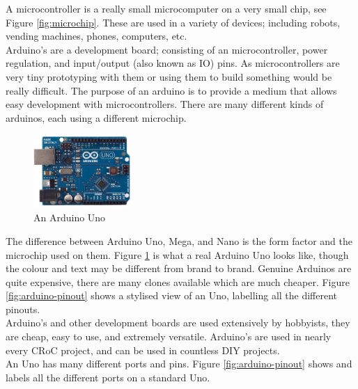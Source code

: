 \documentclass[a4paper,12pt]{article}
\begin{document}
A microcontroller is a really small microcomputer on a very small chip, see Figure \ref{fig:microchip}.
These are used in a variety of devices; including robots, vending machines, phones, computers, etc. \\

Arduino's are a development board; consisting of an microcontroller, power regulation, and input/output (also known as IO) pins. As microcontrollers are very tiny prototyping with them or using them to build something would be really difficult. The purpose of an arduino is to provide a medium that allows easy development with microcontrollers. There are many different kinds of arduinos, each using a different microchip. \\

\begin{figure}
    \centering
    \vspace{-0.5cm}
    \includegraphics[width=0.33\textwidth]{arduino-uno.jpg}
    \caption{An Arduino Uno}
    \label{fig:arduino-real}
\end{figure}


The difference between Arduino Uno, Mega, and Nano is the form factor and the microchip used on them. 
Figure \ref{fig:arduino-real} is what a real Arduino Uno looks like, though the colour and text may be different from brand to brand. Genuine Arduinos are quite expensive, there are many clones available which are much cheaper. Figure \ref{fig:arduino-pinout} shows a stylised view of an Uno, labelling all the different pinouts. \\

Arduino's and other development boards are used extensively by hobbyists, they are cheap, easy to use, and extremely versatile. Arduino's are used in nearly every CRoC project, and can be used in countless DIY projects. \\


An Uno has many different ports and pins. Figure \ref{fig:arduino-pinout} shows and labels all the different ports on a standard Uno. \\
\end{document}
